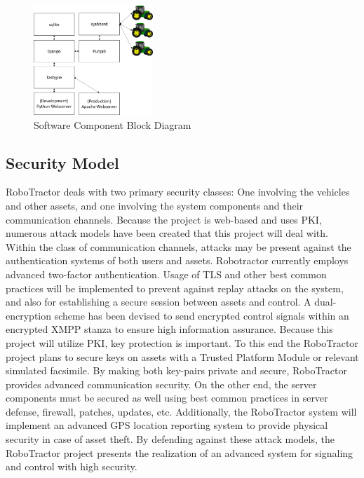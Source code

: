 \documentclass[conference,12pt]{IEEEtran}
\begin{document}
\begin{figure}
\centering
\includegraphics[width=0.4\textwidth]{SoftwareComponentBlockDiagram.pdf}
\caption{Software Component Block Diagram}
\label{fig:softwarecomponents}
\end{figure}

\subsection{Security Model}
RoboTractor deals with two primary security classes: One involving the vehicles
and other assets, and one involving the system components and their communication channels.
Because the project is web-based and uses PKI, numerous attack models have
been created that this project will deal with. Within the class of communication channels,
attacks may be present against the authentication systems of both users and assets. Robotractor currently employs
advanced two-factor authentication. Usage of TLS and other best common practices will be implemented to prevent
against replay attacks on the system, and also for establishing a secure session between assets and control.
A dual-encryption scheme has been devised to send encrypted control signals within an encrypted XMPP stanza
to ensure high information assurance. Because this project will utilize PKI, key protection is important. To this end
the RoboTractor project plans to secure keys on assets with a Trusted Platform Module or relevant simulated facsimile.
By making both key-pairs private and secure, RoboTractor provides advanced communication security.
On the other end, the server components must be secured as well using best common practices in server defense, firewall,
patches, updates, etc. Additionally, the RoboTractor system will implement an advanced GPS location reporting system
to provide physical security in case of asset theft. By defending against these attack models, the RoboTractor project
presents the realization of an advanced system for signaling and control with high security. 
\end{document}
